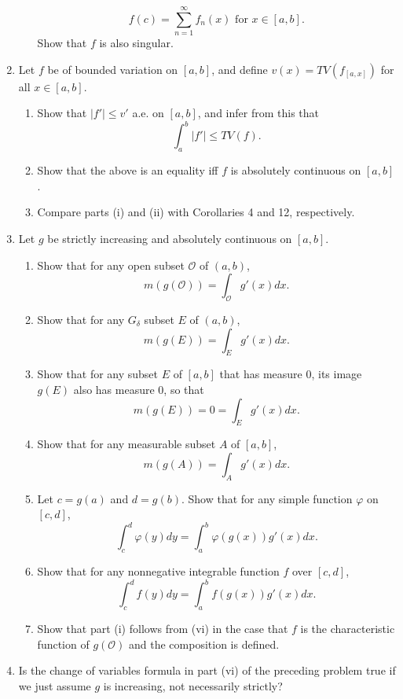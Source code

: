 \begin{enumerate}
\begin{enumerate}[label=(\roman*),align=left]
        \[
            f(c)=\sum_{n=1}^\infty f_n(x)\text{ for }x\in[a,b].  
        \]
        Show that $f$ is also singular.
    \end{enumerate}
    \item Let $f$ be of bounded variation on $[a,b]$, and define $v(x)=TV(f_{[a,x]})$ for all $x\in[a,b]$.
    \begin{enumerate}[label=(\roman*),align=left]
        \item Show that $|f'|\le v'$ a.e. on $[a,b]$, and infer from this that 
        \[
            \int_a^b|f'|\le TV(f).  
        \]
        \item Show that the above is an equality iff $f$ is absolutely continuous on $[a,b]$.
        \item Compare parts (i) and (ii) with Corollaries 4 and 12, respectively.
    \end{enumerate}
    \item Let $g$ be strictly increasing and absolutely continuous on $[a,b]$.
    \begin{enumerate}[label=(\roman*),align=left]
        \item Show that for any open subset $\mathcal{O}$ of $(a,b)$,
        \[
            m(g(\mathcal{O}))=\int_{\mathcal{O}}g'(x)dx.  
        \]
        \item Show that for any $G_\delta$ subset $E$ of $(a,b)$,
        \[
            m(g(E))=\int_Eg'(x)dx.  
        \]
        \item Show that for any subset $E$ of $[a,b]$ that has measure 0, its image $g(E)$ also has measure 0, so that
        \[
            m(g(E))=0=\int_{E}g'(x)dx.  
        \]
        \item Show that for any measurable subset $A$ of $[a,b]$,
        \[
            m(g(A))=\int_{A}g'(x)dx.  
        \]
        \item Let $c=g(a)$ and $d=g(b)$. Show that for any simple function $\varphi$ on $[c,d]$,
        \[
            \int_c^d\varphi(y)dy=\int_a^b\varphi(g(x))g'(x)dx.
        \]
        \item Show that for any nonnegative integrable function $f$ over $[c,d]$,
        \[
            \int_c^df(y)dy=\int_a^bf(g(x))g'(x)dx.
        \]
        \item Show that part (i) follows from (vi) in the case that $f$ is the characteristic function of $g(\mathcal{O})$ and the composition is defined.
    \end{enumerate}
    \item Is the change of variables formula in part (vi) of the preceding problem true if we just assume $g$ is increasing, not necessarily strictly?

\end{enumerate}
